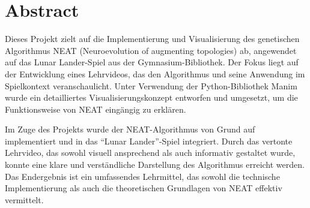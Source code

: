 \chapter*{Abstract}
Dieses Projekt zielt auf die Implementierung und Visualisierung des genetischen Algorithmus NEAT (Neuroevolution of augmenting topologies) ab, angewendet auf das {Lunar Lander}-Spiel aus der Gymnasium-Bibliothek. Der Fokus liegt auf der Entwicklung eines Lehrvideos, das den Algorithmus und seine Anwendung im Spielkontext veranschaulicht. Unter Verwendung der Python-Bibliothek Manim wurde ein detailliertes Visualisierungskonzept entworfen und umgesetzt, um die Funktionsweise von NEAT eingängig zu erklären.

Im Zuge des Projekts wurde der NEAT-Algorithmus von Grund auf implementiert und in das \enquote{Lunar Lander}-Spiel integriert. Durch das vertonte Lehrvideo, das sowohl visuell ansprechend als auch informativ gestaltet wurde, konnte eine klare und verständliche Darstellung des Algorithmus erreicht werden. Das Endergebnis ist ein umfassendes Lehrmittel, das sowohl die technische Implementierung als auch die theoretischen Grundlagen von NEAT effektiv vermittelt.
